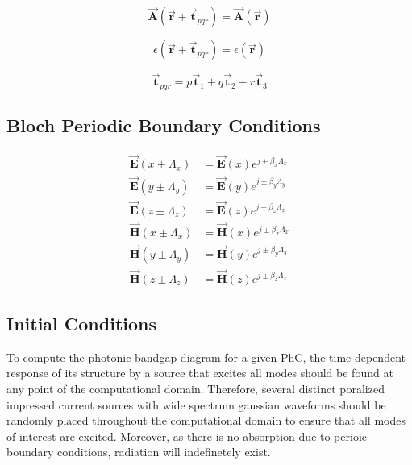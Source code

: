\documentclass[journal,transmag]{IEEEtran}
\begin{document}
\begin{equation}
	\vec{\bm{A}}(\vec{\bm{r}} + \vec{\bm{t}}_{pqr}) = 
	\vec{\bm{A}}(\vec{\bm{r}})
\end{equation}

\begin{equation}
	\epsilon(\vec{\bm{r}} + \vec{\bm{t}}_{pqr}) = 
	\epsilon(\vec{\bm{r}})
\end{equation}


\begin{equation}
	\vec{\bm{t}}_{pqr} = p\vec{\bm{t}}_{1} + q\vec{\bm{t}}_{2}+ r\vec{\bm{t}}_{3}
\end{equation}

\the\textwidth
\the\columnwidth{}

\subsection{Bloch Periodic Boundary Conditions}
\begin{align}
	\vec{\bm{E}}(x \pm \Lambda_{x}) & = 
	\vec{\bm{E}}(x) e^{j\pm \beta_{x} \Lambda_{x}} \\
	\vec{\bm{E}}(y \pm \Lambda_{y}) & = 
	\vec{\bm{E}}(y) e^{j\pm \beta_{y} \Lambda_{y}} \\
	\vec{\bm{E}}(z \pm \Lambda_{z}) & = 
	\vec{\bm{E}}(z) e^{j\pm \beta_{z} \Lambda_{z}} \\
	\vec{\bm{H}}(x \pm \Lambda_{x}) & = 
	\vec{\bm{H}}(x) e^{j\pm \beta_{x} \Lambda_{x}} \\
	\vec{\bm{H}}(y \pm \Lambda_{y}) & = 
	\vec{\bm{H}}(y) e^{j\pm \beta_{y} \Lambda_{y}} \\
	\vec{\bm{H}}(z \pm \Lambda_{z}) & = 
	\vec{\bm{H}}(z) e^{j\pm \beta_{z} \Lambda_{z}}
\end{align}

\subsection{Initial Conditions}
To compute the photonic bandgap diagram for a given PhC, the time-dependent response of its structure by a source that excites all modes should be found at any point of the computational domain. Therefore, several distinct poralized impressed current sources with wide spectrum gaussian waveforms should be randomly placed throughout the computational domain to ensure that all modes of interest are excited. Moreover, as there is no absorption due to perioic boundary conditions, radiation will indefinetely exist.
\end{document}
